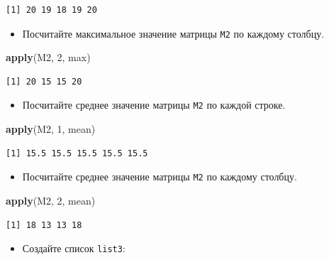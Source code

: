 \documentclass[
]{book}
\newenvironment{Shaded}{\begin{snugshade}}{\end{snugshade}}
\newcommand{\DecValTok}[1]{\textcolor[rgb]{0.00,0.00,0.81}{#1}}
\newcommand{\KeywordTok}[1]{\textcolor[rgb]{0.13,0.29,0.53}{\textbf{#1}}}
\newcommand{\NormalTok}[1]{#1}
\providecommand{\tightlist}{%
  \setlength{\itemsep}{0pt}\setlength{\parskip}{0pt}}
\begin{document}
\begin{verbatim}
[1] 20 19 18 19 20
\end{verbatim}

\begin{itemize}
\tightlist
\item
  Посчитайте максимальное значение матрицы \texttt{M2} по каждому столбцу.
\end{itemize}

\begin{Shaded}
\begin{Highlighting}[]
\KeywordTok{apply}\NormalTok{(M2, }\DecValTok{2}\NormalTok{, max)}
\end{Highlighting}
\end{Shaded}

\begin{verbatim}
[1] 20 15 15 20
\end{verbatim}

\begin{itemize}
\tightlist
\item
  Посчитайте среднее значение матрицы \texttt{M2} по каждой строке.
\end{itemize}

\begin{Shaded}
\begin{Highlighting}[]
\KeywordTok{apply}\NormalTok{(M2, }\DecValTok{1}\NormalTok{, mean)}
\end{Highlighting}
\end{Shaded}

\begin{verbatim}
[1] 15.5 15.5 15.5 15.5 15.5
\end{verbatim}

\begin{itemize}
\tightlist
\item
  Посчитайте среднее значение матрицы \texttt{M2} по каждому столбцу.
\end{itemize}

\begin{Shaded}
\begin{Highlighting}[]
\KeywordTok{apply}\NormalTok{(M2, }\DecValTok{2}\NormalTok{, mean)}
\end{Highlighting}
\end{Shaded}

\begin{verbatim}
[1] 18 13 13 18
\end{verbatim}

\begin{itemize}
\tightlist
\item
  Создайте список \texttt{list3}:
\end{itemize}
\end{document}
